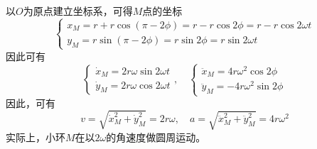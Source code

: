 \begin{solution}
以$O$为原点建立坐标系，可得$M$点的坐标
\begin{equation*}
\begin{cases}
	x_M = r+r\cos(\pi-2\phi) = r-r\cos 2\phi = r-r\cos 2\omega t \\
	y_M = r\sin(\pi-2\phi) = r\sin 2\phi = r\sin 2\omega t
\end{cases}
\end{equation*}
因此可有
\begin{equation*}
\begin{cases}
	\dot{x}_M = 2r\omega \sin 2\omega t \\
	\dot{y}_M = 2r\omega \cos 2\omega t
\end{cases},\quad 
\begin{cases}
	\ddot{x}_M = 4r\omega^2 \cos 2\phi \\
	\ddot{y}_M = -4r\omega^2 \sin 2\phi
\end{cases}
\end{equation*}
因此，可有
\begin{equation*}
	v = \sqrt{\dot{x}_M^2 + \dot{y}_M^2} = 2r\omega,\quad a = \sqrt{\ddot{x}_M^2 + \ddot{y}_M^2} = 4r\omega^2 
\end{equation*}
实际上，小环$M$在以$2\omega$的角速度做圆周运动。
\end{solution}

